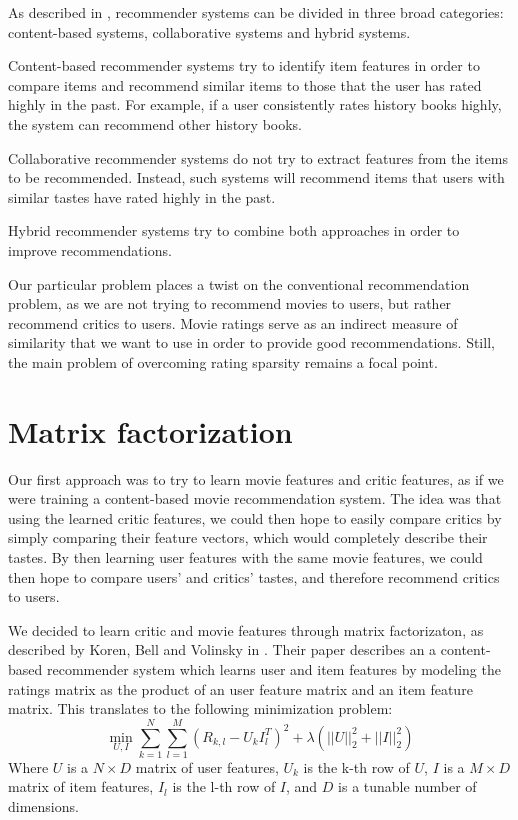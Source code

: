 \documentclass[12pt]{article}
\begin{document}
As described in \cite{Survey05}, recommender systems can be divided in three broad categories: content-based systems, collaborative systems and hybrid systems. 

Content-based recommender systems try to identify item features in order to compare items and recommend similar items to those that the user has rated highly in the past.  For example, if a user consistently rates history books highly, the system can recommend other history books.

Collaborative recommender systems do not try to extract features from the items
to be recommended. Instead, such systems will recommend items that users with similar tastes have rated highly in the past.

Hybrid recommender systems try to combine both approaches in order to improve recommendations.

Our particular problem places a twist on the conventional recommendation problem, as we are not trying to recommend movies to users, but rather recommend critics to users. Movie ratings serve as an indirect measure of similarity that we want to use in order to provide good recommendations. Still, the main problem of overcoming rating sparsity remains a focal point.

\section{Matrix factorization}

Our first approach was to try to learn movie features and critic features, as if we were training a content-based movie recommendation system. The idea was that using the learned critic features, we could then hope to easily compare critics by simply comparing their feature vectors, which would completely describe their tastes. By then learning user features with the same movie features, we could then hope to compare users' and critics' tastes, and therefore recommend critics to users. 

We decided to learn critic and movie features through matrix factorizaton, as described by Koren, Bell and Volinsky in \cite{Koren09}. Their paper describes an a content-based recommender system which learns user and item features by modeling the ratings matrix as the product of an user feature matrix and an item feature matrix. This translates to the following minimization problem:
$$ \min_{U,I} \sum_{k = 1}^{N} \sum_{l = 1}^{M} (R_{k,l} - U_k I_l^T)^2 + \lambda (||U||_2^2 + ||I||_2^2) $$
Where $U$ is a $N \times D$ matrix of user features, $U_k$ is the k-th row of $U$, $I$ is a $M \times D$ matrix of item features, $I_l$ is the l-th row of $I$, and $D$ is a tunable number of dimensions.
\end{document}

